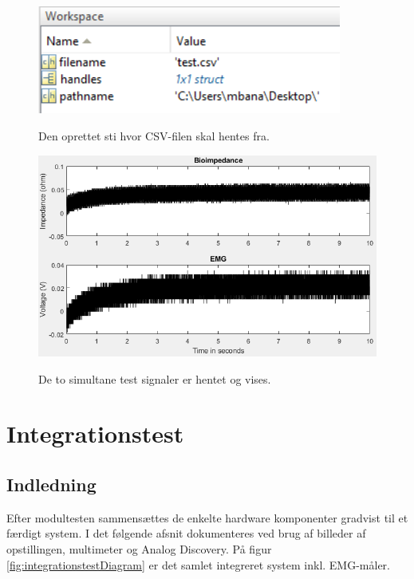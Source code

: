 \begin{figure}[H] 
\centering
{\includegraphics[width=10cm]
{Figure/modultestLoad1}}
\caption{Den oprettet sti hvor CSV-filen skal hentes fra.}
\label{fig:modultestLoad1}
\end{figure}


\begin{figure}[H] 
\centering
{\includegraphics[width=\linewidth]
{Figure/modultestLoad2}}
\caption{De to simultane test signaler er hentet og vises.}
\label{fig:modultestLoad2}
\end{figure}





\chapter{Integrationstest}

\section{Indledning}


Efter modultesten sammensættes de enkelte hardware komponenter gradvist til et færdigt system. I det følgende afsnit dokumenteres ved brug af billeder af opstillingen, multimeter og Analog Discovery. På figur \ref{fig:integrationstestDiagram} er det samlet integreret system inkl. EMG-måler.

